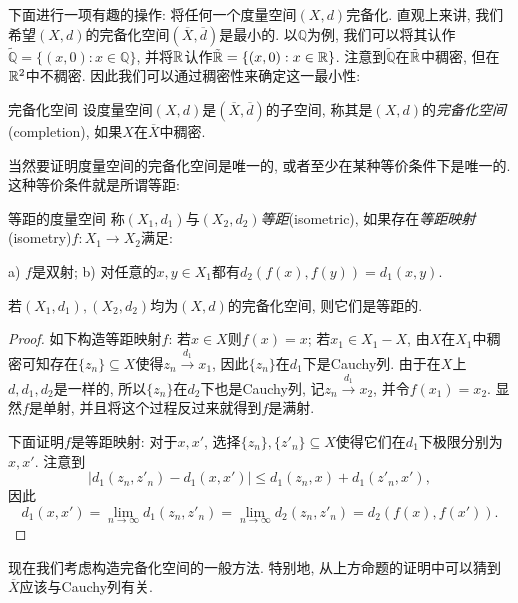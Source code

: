 下面进行一项有趣的操作: 将任何一个度量空间$(X,d)$完备化. 直观上来讲, 我们希望$(X,d)$的完备化空间$(\overline{X},\overline{d})$是最小的. 以$\mathbb{Q}$为例, 我们可以将其认作$\tilde{\mathbb{Q}}=\{ (x,0):x \in \mathbb{Q} \}$, 并将$\mathbb{R}$认作$\tilde{\mathbb{R}}=\{ (x,0):x \in \mathbb{R} \}$. 注意到$\tilde{\mathbb{Q}}$在$\tilde{\mathbb{R}}$中稠密, 但在$\mathbb{R} ^2$中不稠密. 因此我们可以通过稠密性来确定这一最小性:

\begin{definition}{完备化空间}
	设度量空间$(X,d)$是$(\overline{X},\overline{d})$的子空间, 称其是$(X,d)$的\textit{完备化空间}(completion), 如果$X$在$\overline{X}$中稠密. 
\end{definition}

当然要证明度量空间的完备化空间是唯一的, 或者至少在某种等价条件下是唯一的. 这种等价条件就是所谓等距: 

\begin{definition}{等距的度量空间}
	称$(X_1,d_1)$与$(X_2,d_2)$\textit{等距}(isometric), 如果存在\textit{等距映射}(isometry)$f:X_1 \to X_2$满足: 
	
	a) $f$是双射; \qquad b) 对任意的$x,y \in X_1$都有$d_2(f(x),f(y))=d_1(x,y)$. 
\end{definition}

\begin{proposition}{}
	若$(X_1,d_1),(X_2,d_2)$均为$(X,d)$的完备化空间, 则它们是等距的. 
\end{proposition}
\begin{proof}
	如下构造等距映射$f$: 若$x \in X$则$f(x) = x$; 若$x_1 \in X_1-X$, 由$X$在$X_1$中稠密可知存在$\{ z_n \} \subseteq X$使得$z_n \stackrel{d_1}{\longrightarrow} x_1$, 因此$\{ z_n \}$在$d_1$下是Cauchy列. 由于在$X$上$d,d_1,d_2$是一样的, 所以$\{ z_n \}$在$d_2$下也是Cauchy列, 记$z_n \stackrel{d_1}{\longrightarrow} x_2$, 并令$f(x_1)=x_2$. 显然$f$是单射, 并且将这个过程反过来就得到$f$是满射. 
	
	下面证明$f$是等距映射: 对于$x,x'$, 选择$\{ z_n \},\{ z'_n \} \subseteq X$使得它们在$d_1$下极限分别为$x,x'$. 注意到$$|d_1(z_n,z'_n)-d_1(x,x')| \leq d_1(z_n,x) + d_1(z'_n,x'),$$
	因此$$d_1(x,x') = \lim_{n\to \infty} d_1(z_n,z'_n) = \lim_{n\to \infty} d_2(z_n,z'_n) = d_2(f(x),f(x')).$$
\end{proof}

现在我们考虑构造完备化空间的一般方法. 特别地, 从上方命题的证明中可以猜到$\overline{X}$应该与Cauchy列有关. 

